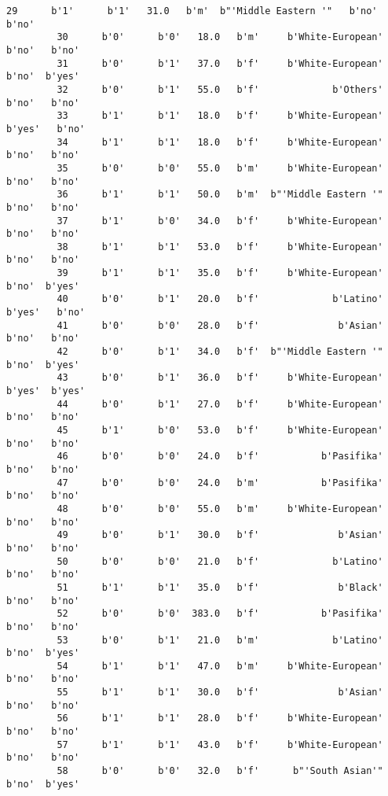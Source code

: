 \documentclass[11pt]{article}
\begin{document}
\begin{Verbatim}[commandchars=\\\{\}]
         29      b'1'      b'1'   31.0   b'm'  b"'Middle Eastern '"   b'no'   b'no'   
         30      b'0'      b'0'   18.0   b'm'     b'White-European'   b'no'   b'no'   
         31      b'0'      b'1'   37.0   b'f'     b'White-European'   b'no'  b'yes'   
         32      b'0'      b'1'   55.0   b'f'             b'Others'   b'no'   b'no'   
         33      b'1'      b'1'   18.0   b'f'     b'White-European'  b'yes'   b'no'   
         34      b'1'      b'1'   18.0   b'f'     b'White-European'   b'no'   b'no'   
         35      b'0'      b'0'   55.0   b'm'     b'White-European'   b'no'   b'no'   
         36      b'1'      b'1'   50.0   b'm'  b"'Middle Eastern '"   b'no'   b'no'   
         37      b'1'      b'0'   34.0   b'f'     b'White-European'   b'no'   b'no'   
         38      b'1'      b'1'   53.0   b'f'     b'White-European'   b'no'   b'no'   
         39      b'1'      b'1'   35.0   b'f'     b'White-European'   b'no'  b'yes'   
         40      b'0'      b'1'   20.0   b'f'             b'Latino'  b'yes'   b'no'   
         41      b'0'      b'0'   28.0   b'f'              b'Asian'   b'no'   b'no'   
         42      b'0'      b'1'   34.0   b'f'  b"'Middle Eastern '"   b'no'  b'yes'   
         43      b'0'      b'1'   36.0   b'f'     b'White-European'  b'yes'  b'yes'   
         44      b'0'      b'1'   27.0   b'f'     b'White-European'   b'no'   b'no'   
         45      b'1'      b'0'   53.0   b'f'     b'White-European'   b'no'   b'no'   
         46      b'0'      b'0'   24.0   b'f'           b'Pasifika'   b'no'   b'no'   
         47      b'0'      b'0'   24.0   b'm'           b'Pasifika'   b'no'   b'no'   
         48      b'0'      b'0'   55.0   b'm'     b'White-European'   b'no'   b'no'   
         49      b'0'      b'1'   30.0   b'f'              b'Asian'   b'no'   b'no'   
         50      b'0'      b'0'   21.0   b'f'             b'Latino'   b'no'   b'no'   
         51      b'1'      b'1'   35.0   b'f'              b'Black'   b'no'   b'no'   
         52      b'0'      b'0'  383.0   b'f'           b'Pasifika'   b'no'   b'no'   
         53      b'0'      b'1'   21.0   b'm'             b'Latino'   b'no'  b'yes'   
         54      b'1'      b'1'   47.0   b'm'     b'White-European'   b'no'   b'no'   
         55      b'1'      b'1'   30.0   b'f'              b'Asian'   b'no'   b'no'   
         56      b'1'      b'1'   28.0   b'f'     b'White-European'   b'no'   b'no'   
         57      b'1'      b'1'   43.0   b'f'     b'White-European'   b'no'   b'no'   
         58      b'0'      b'0'   32.0   b'f'      b"'South Asian'"   b'no'  b'yes'   

\end{Verbatim}
\end{document}
